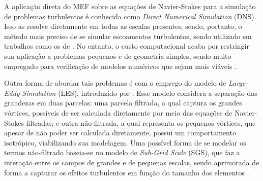 A aplicação direta do MEF sobre as equações de Navier-Stokes para a simulação de problemas turbulentos é conhecida como \textit{Direct Numerical Simulation} (DNS). Isso as resolve diretamente em todas as escalas presentes, sendo, portanto, o método mais preciso de se simular escoamentos turbulentos, sendo utilizado em trabalhos como os de . No entanto, o custo computacional acaba por restringir sua aplicação a problemas pequenos e de geometria simples, sendo muito empregado para verificação de modelos numéricos que sejam mais viáveis \cite{piomelli1999large,yokokawa200216}.


Outra forma de abordar tais problemas é com o emprego do modelo de \textit{Large-Eddy Simulation} (LES), introduzido por . Esse modelo considera a separação das grandezas em duas parcelas: uma parcela filtrada, a qual captura os grandes vórtices, possíveis de ser calculada diretamente por meio das equações de Navier-Stokes filtradas; e outra não-filtrada, a qual representa os pequenos vórtices, que apesar de não poder ser calculada diretamente, possui um comportamento isotrópico, viabilizando sua modelagem. Uma possível forma de se modelar os termos não-filtrado baseia-se no modelo de \textit{Sub-Grid Scale} (SGS), que faz a interação entre os campos de grandes e de pequenas escalas, sendo aprimorada de forma a capturar os efeitos turbulentos em função do tamanho dos elementos \cite{ghosal1995basic,hughes2000large,moeng2015large}.%

